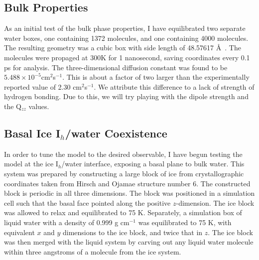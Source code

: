 \subsection{Bulk Properties}
As an initial test of the bulk phase properties, I have equilibrated two
separate water boxes, one containing 1372 molecules, and one
containing 4000 molecules. The resulting geometry was a cubic
box with side length of 48.57617 \AA~. The molecules were propaged at 300K for
1 nanosecond, saving coordinates every 0.1 ps for analysis. The 
three-dimensional diffusion constant was found to be 
$5.488\times10^{-5}$cm$^{2}$s$^{-1}$. This is about a factor of two larger
than the experimentally reported value of 2.30 cm$^{2}$s$^{-1}$. We attribute
this difference to a lack of strength of hydrogen bonding. Due to this,
we will try playing with the dipole strength and the Q$_{zz}$ values.
		

\subsection{Basal Ice I$_{h}$/water Coexistence}
In order to tune the model to the desired observable, I have begun testing 
the model at the ice I$_{h}$/water interface, exposing a basal plane to bulk 
water. This system was prepared by constructing a large block of ice from 
crystallographic coordinates taken from Hirsch and Ojamae structure number
6\cite{Hirsch04}. The constructed block is periodic in all three dimensions. 
The block was positioned in a simulation cell such that the basal face pointed
along the positive $z$-dimension. The ice block was allowed to relax and 
equilibrated to 75 K. Separately, a simulation box of liquid water with a 
density of 0.999 g cm$^{-1}$ was 
equilibrated to 75 K, with equivalent $x$ and $y$ dimensions to the ice block,
and twice that in $z$. The ice block was then merged with the liquid system
by carving out any liquid water molecule within three angstroms of a molecule
from the ice system.
	
	

		